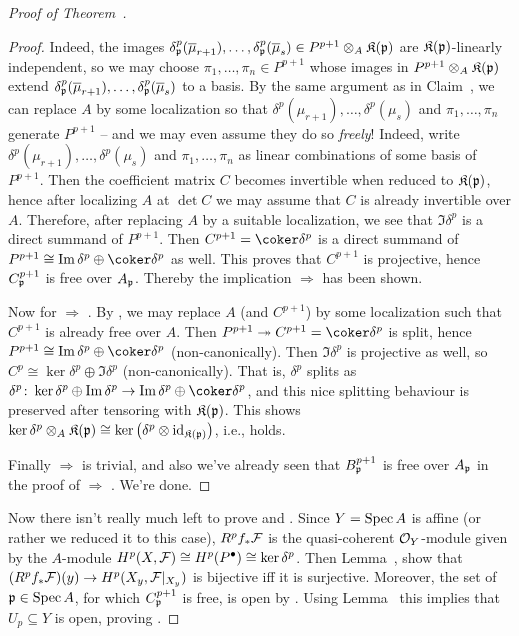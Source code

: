 \documentclass[a4paper,parskip=half,numbers=enddot, DIV=12]{scrreprt}
\begin{document}
\begin{proof}[Proof of Theorem~]
\begin{proof}
	Indeed, the images $\delta_{\mathfrak{p}}^p(\overline{\mu}_{r+1}),\ldots,\delta_{\mathfrak{p}}^p(\overline{\mu}_s)\in P^{p+1}\otimes_A\mathfrak{K}(\mathfrak{p})$ are $\mathfrak{K}(\mathfrak{p})$-linearly independent, so we may choose $\pi_1,\ldots,\pi_n\in P^{p+1}$ whose images in $P^{p+1}\otimes_A\mathfrak{K}(\mathfrak{p})$ extend $\delta_{\mathfrak{p}}^p(\overline{\mu}_{r+1}),\ldots,\delta_{\mathfrak{p}}^p(\overline{\mu}_s)$ to a basis.
	By the same argument as in Claim~, we can replace $A$ by some localization so that $\delta^p(\mu_{r+1}),\ldots,\delta^p(\mu_s)$ and $\pi_1,\ldots,\pi_n$ generate $P^{p+1}$ -- and we may even assume they do so \emph{freely}! Indeed, write $\delta^p(\mu_{r+1}),\ldots,\delta^p(\mu_s)$ and $\pi_1,\ldots,\pi_n$ as linear combinations of some basis of $P^{p+1}$. Then the coefficient matrix $C$ becomes invertible when reduced to $\mathfrak{K}(\mathfrak{p})$, hence after localizing $A$ at $\det C$ we may assume that $C$ is already invertible over $A$. Therefore, after replacing $A$ by a suitable localization, we see that $\Im\delta^p$ is a direct summand of $P^{p+1}$. Then $C^{p+1}=\coker\delta^p$ is a direct summand of $P^{p+1}\cong \Im\delta^p\oplus\coker\delta^p$ as well. This proves that $C^{p+1}$ is projective, hence $C^{p+1}_{\mathfrak{p}}$ is free over $A_{\mathfrak{p}}$. Thereby the implication  $\Rightarrow$  has been shown.
	
	Now for  $\Rightarrow$ . By \cite[Corollary~1.5.1]{alg2}, we may replace $A$ (and $C^{p+1}$) by some localization such that $C^{p+1}$ is already free over $A$. Then $P^{p+1}\epimorphism C^{p+1}=\coker\delta^p$ is split, hence $P^{p+1}\cong \Im\delta^p\oplus \coker\delta^p$ (non-canonically). Then $\Im\delta^p$ is projective as well, so $C^p\cong \ker\delta^p\oplus\Im\delta^p$ (non-canonically). That is, $\delta^p$ splits as $\delta^p\colon \ker\delta^p\oplus\Im\delta^p\morphism\Im\delta^p\oplus\coker\delta^p$, and this nice splitting behaviour is preserved after tensoring with $\mathfrak{K}(\mathfrak{p})$. This shows $\ker\delta^p\otimes_A\mathfrak{K}(\mathfrak{p})\cong \ker\left(\delta^p\otimes\operatorname{id}_{\mathfrak{K}(\mathfrak{p})}\right)$, i.e.,  holds.
	
	Finally  $\Rightarrow$  is trivial, and also we've already seen that $B_{\mathfrak{p}}^{p+1}$ is free over $A_{\mathfrak{p}}$ in the proof of  $\Rightarrow$ . We're done.
\end{proof}

	Now there isn't really much left to prove  and . Since $Y=\operatorname{Spec} A$ is affine (or rather we reduced it to this case), $R^pf_*\mathcal{F}$ is the quasi-coherent $\mathcal{O}_Y$-module given by the $A$-module $H^p(X,\mathcal{F})\cong H^p(P^\bullet)\cong \ker\delta^p$. Then Lemma~,  show that $(R^pf_*\Ff)(y)\morphism H^p(X_y,\Ff|_{X_y})$ is bijective iff it is surjective. Moreover, the set of $\mathfrak{p}\in\operatorname{Spec} A$, for which $C_{\mathfrak{p}}^{p+1}$ is free, is open by \cite[Corollary~1.5.1]{alg2}. Using Lemma~ this implies that $U_p\subseteq Y$ is open, proving .
	

\end{proof}
\end{document}
